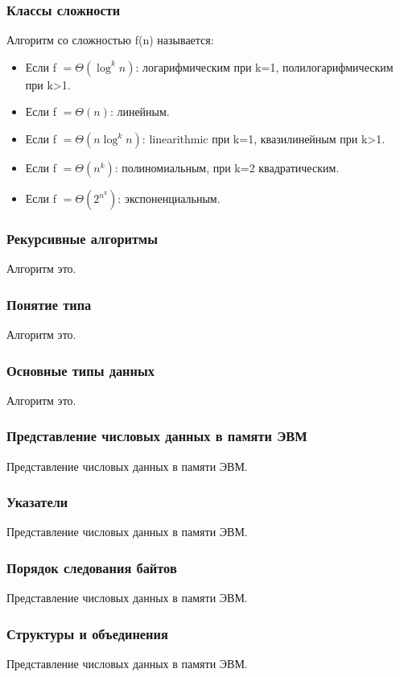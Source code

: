 \documentclass[russian, 12pt]{beamer}
\begin{document}
\begin{frame}
\frametitle{Классы сложности}
Алгоритм со сложностью f(n) называется:
\begin{itemize}
  \item Если f $=\Theta(\log^kn)$: 
  логарифмическим при k=1, полилогарифмическим при k>1.\\[0.3cm]

  \item Если f $=\Theta(n)$: 
  линейным.\\[0.3cm]

  \item Если f $=\Theta(n\log^kn)$: 
  linearithmic при k=1, квазилинейным при k>1.\\[0.3cm]
  
  \item Если f $=\Theta(n^k)$: 
  полиномиальным, при k=2 квадратическим. \\[0.3cm]
  
  \item Если f $=\Theta(2^{n^k})$: 
  экспоненциальным. \\

\end{itemize}
\end{frame}
\begin{frame}
\frametitle{Рекурсивные алгоритмы}
Алгоритм это.
\end{frame}
\begin{frame}
\frametitle{Понятие типа}
Алгоритм это.
\end{frame}
\begin{frame}
\frametitle{Основные типы данных}
Алгоритм это.
\end{frame}
\begin{frame}
\frametitle{Представление числовых данных в памяти ЭВМ}
Представление числовых данных в памяти ЭВМ.
\end{frame}
\begin{frame}
\frametitle{Указатели}
Представление числовых данных в памяти ЭВМ.
\end{frame}
\begin{frame}
\frametitle{Порядок следования байтов}
Представление числовых данных в памяти ЭВМ.
\end{frame}
\begin{frame}
\frametitle{Структуры и объединения }
Представление числовых данных в памяти ЭВМ.
\end{frame}
\end{document}
